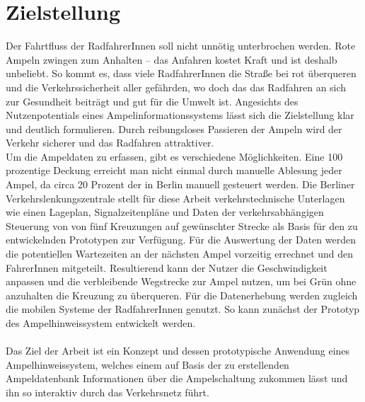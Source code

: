 \section{Zielstellung}
Der Fahrtfluss der RadfahrerInnen soll nicht unnötig unterbrochen werden. Rote Ampeln zwingen zum Anhalten -- das Anfahren kostet Kraft und ist deshalb unbeliebt. So kommt es, dass viele RadfahrerInnen die Straße bei rot überqueren und die Verkehrssicherheit aller gefährden, wo doch das das Radfahren an sich zur Gesundheit beiträgt und gut für die Umwelt ist. Angesichts des Nutzenpotentials eines Ampelinformationssystems lässt sich die Zielstellung klar und deutlich formulieren. Durch reibungsloses Passieren der Ampeln wird der Verkehr sicherer und das Radfahren attraktiver.\\
Um die Ampeldaten zu erfassen, gibt es verschiedene Möglichkeiten. Eine 100 prozentige Deckung erreicht man nicht einmal durch manuelle Ablesung jeder Ampel, da circa 20 Prozent der  in Berlin manuell gesteuert werden. Die Berliner Verkehrslenkungszentrale stellt für diese Arbeit verkehrstechnische Unterlagen wie einen Lageplan, Signalzeitenpläne und Daten der verkehrsabhängigen Steuerung von  von fünf Kreuzungen auf gewünschter Strecke als Basis für den zu entwickelnden Prototypen zur Verfügung.
Für die Auswertung der Daten werden die potentiellen Wartezeiten an der nächsten Ampel vorzeitig errechnet und den FahrerInnen mitgeteilt. Resultierend kann der Nutzer die Geschwindigkeit anpassen und die verbleibende Wegstrecke zur Ampel nutzen, um bei Grün ohne anzuhalten die Kreuzung zu überqueren. Für die Datenerhebung werden zugleich die mobilen Systeme der RadfahrerInnen genutzt. So kann zunächst der Prototyp des Ampelhinweissystem entwickelt werden.\\\\
Das Ziel der Arbeit ist ein Konzept und dessen prototypische Anwendung eines Ampelhinweissystem, welches einem auf Basis der zu erstellenden  Ampeldatenbank Informationen über die Ampelschaltung zukommen lässt und ihn so interaktiv durch das Verkehrsnetz führt.
